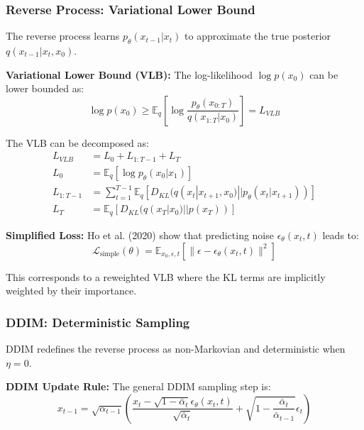 \documentclass[a4paper,12pt]{article}
\begin{document}
\subsubsection{Reverse Process: Variational Lower Bound}

The reverse process learns $p_\theta(x_{t-1} | x_t)$ to approximate the true posterior $q(x_{t-1} | x_t, x_0)$.

\textbf{Variational Lower Bound (VLB):} The log-likelihood $\log p(x_0)$ can be lower bounded as:
\begin{equation}
\log p(x_0) \geq \mathbb{E}_{q} \left[ \log \frac{p_\theta(x_{0:T})}{q(x_{1:T} | x_0)} \right] = L_{VLB}
\label{eq:vlb_definition}
\end{equation}

The VLB can be decomposed as:
\begin{align}
L_{VLB} &= L_0 + L_{1:T-1} + L_T \\
L_0 &= \mathbb{E}_{q} \left[ \log p_\theta(x_0 | x_1) \right] \\
L_{1:T-1} &= \sum_{t=1}^{T-1} \mathbb{E}_{q} \left[ D_{KL}(q(x_t | x_{t+1}, x_0) || p_\theta(x_t | x_{t+1})) \right] \\
L_T &= \mathbb{E}_{q} \left[ D_{KL}(q(x_T | x_0) || p(x_T)) \right]
\label{eq:vlb_terms}
\end{align}

\textbf{Simplified Loss:} Ho et al. (2020) show that predicting noise $\epsilon_\theta(x_t, t)$ leads to:
\begin{equation}
\mathcal{L}_{\text{simple}}(\theta) = \mathbb{E}_{x_0, \epsilon, t} \left[ \|\epsilon - \epsilon_\theta(x_t, t)\|^2 \right]
\label{eq:simple_loss}
\end{equation}

This corresponds to a reweighted VLB where the KL terms are implicitly weighted by their importance.

\subsubsection{DDIM: Deterministic Sampling}

DDIM redefines the reverse process as non-Markovian and deterministic when $\eta = 0$.

\textbf{DDIM Update Rule:} The general DDIM sampling step is:
\begin{equation}
x_{t-1} = \sqrt{\alpha_{t-1}} \left( \frac{x_t - \sqrt{1 - \bar{\alpha}_t} \epsilon_\theta(x_t, t)}{\sqrt{\bar{\alpha}_t}} + \sqrt{1 - \frac{\bar{\alpha}_t}{\bar{\alpha}_{t-1}}} \epsilon_t \right)
\label{eq:ddim_general}
\end{equation}
\end{document}
